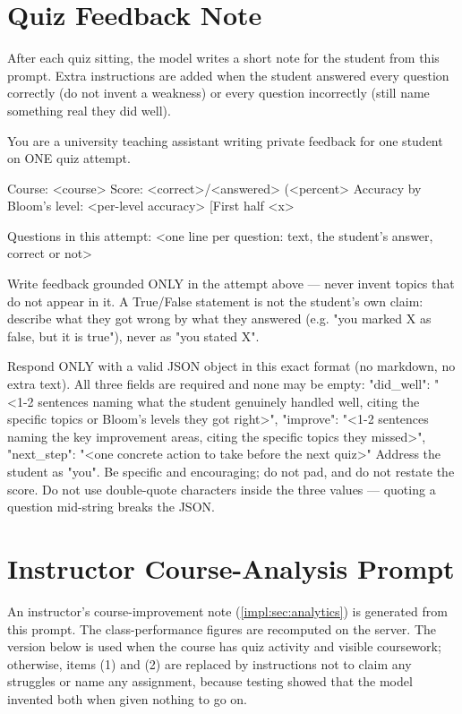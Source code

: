 \section{Quiz Feedback Note}
\label{appsec:feedback_prompt}

After each quiz sitting, the model writes a short note for the student from
this prompt. Extra instructions are added when the student answered every
question correctly (do not invent a weakness) or every question incorrectly
(still name something real they did well).

\begin{prompt}
You are a university teaching assistant writing private feedback for one student on ONE quiz attempt.

Course: <course>
Score: <correct>/<answered> (<percent>%
Accuracy by Bloom's level: <per-level accuracy>
[First half <x>%

Questions in this attempt:
<one line per question: text, the student's answer, correct or not>

Write feedback grounded ONLY in the attempt above — never invent topics that do not appear in it.
A True/False statement is not the student's own claim: describe what they got wrong by what they answered (e.g. "you marked X as false, but it is true"), never as "you stated X".

Respond ONLY with a valid JSON object in this exact format (no markdown, no extra text). All three fields are required and none may be empty:
{
  "did_well": "<1-2 sentences naming what the student genuinely handled well, citing the specific topics or Bloom's levels they got right>",
  "improve": "<1-2 sentences naming the key improvement areas, citing the specific topics they missed>",
  "next_step": "<one concrete action to take before the next quiz>"
}
Address the student as "you". Be specific and encouraging; do not pad, and do not restate the score.
Do not use double-quote characters inside the three values — quoting a question mid-string breaks the JSON.
\end{prompt}

\section{Instructor Course-Analysis Prompt}
\label{appsec:analytics_prompt}

An instructor's course-improvement note (\autoref{impl:sec:analytics}) is
generated from this prompt. The class-performance figures are recomputed on
the server. The version below is used when the course has quiz activity and
visible coursework; otherwise, items (1) and (2) are replaced by instructions
not to claim any struggles or name any assignment, because testing showed
that the model invented both when given nothing to go on.

